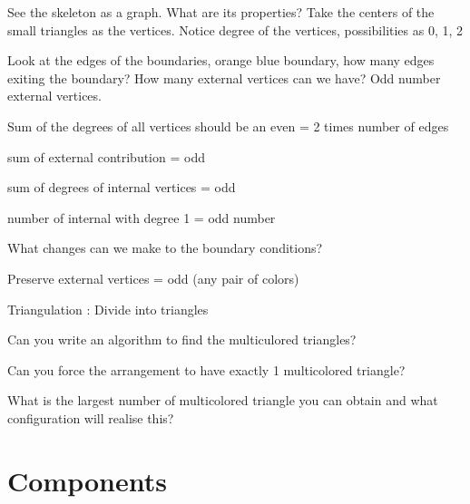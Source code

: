 \documentclass[a4paper,12pt]{article}
\begin{document}



See the skeleton as a graph.
What are its properties?
Take the centers of the small triangles as the vertices.
Notice degree of the vertices, possibilities as 0, 1, 2

Look at the edges of the boundaries, orange blue boundary, how many edges exiting the boundary?
How many external vertices can we have?
Odd number external vertices.

Sum of the degrees of all vertices should be an even = 2 times number of edges

sum of external contribution = odd

sum of degrees of internal vertices = odd

number of internal with degree 1 = odd number

What changes can we make to the boundary conditions?

Preserve external vertices = odd (any pair of colors)

Triangulation : Divide into triangles

Can you write an algorithm to find the multiculored triangles?

Can you force the arrangement to have exactly 1 multicolored triangle?

What is the largest number of multicolored triangle you can obtain and what configuration will realise this?
\section{Components}
\end{document}
